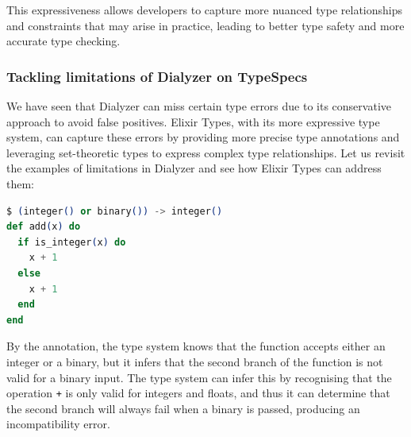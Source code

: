 This expressiveness allows developers to capture more nuanced type relationships and constraints that may arise in practice, leading to better type safety and more accurate type checking.






\subsubsection{Tackling limitations of Dialyzer on TypeSpecs}

We have seen that Dialyzer can miss certain type errors due to its conservative approach to avoid false positives.
Elixir Types, with its more expressive type system, can capture these errors by providing more precise type annotations and leveraging set-theoretic types to express complex type relationships.
Let us revisit the examples of limitations in Dialyzer and see how Elixir Types can address them:

\begin{lstlisting}[language=Elixir, firstnumber=last]
$ (integer() or binary()) -> integer()
def add(x) do
  if is_integer(x) do
    x + 1
  else
    x + 1
  end
end
\end{lstlisting}

By the annotation, the type system knows that the function accepts either an integer or a binary, but it infers that the second branch of the function is not valid for a binary input.
The type system can infer this by recognising that the operation \texttt{+} is only valid for integers and floats, and thus it can determine that the second branch will always fail when a binary is passed, producing an incompatibility error.

